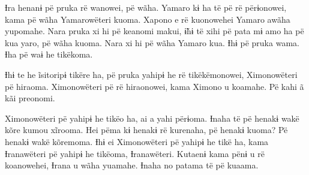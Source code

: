 Ɨra henanɨ pë pruka rë wanowei, pë wãha. Yamaro kɨ ha të pë rë
përɨonowei, kama pë wãha Yamarowëteri kuoma. Xapono e rë kuonowehei
Yamaro awãha yupomahe. Nara pruka xi hi pë keanomi makui, ɨ̃hɨ të xihi pë
pata mɨ amo ha pë kua yaro, pë wãha kuoma. Nara xi hi pë wãha Yamaro
kua. Ɨhɨ pë pruka wama. Ɨha pë waɨ he tikëkoma. 

Ɨhɨ te he ĩsitoripɨ tikëre ha, pë pruka yahipɨ he rë tikëkëmonowei,
Ximonowëteri pë hiraoma. Ximonowëteri pë rë hiraonowei, kama Ximono u
koamahe. Pë kahi ã kãi preonomi. 

Ximonowëteri pë yahipɨ he tikëo ha, ai a yahi përɨoma. Ɨnaha të pë
henakɨ wakë kõre kumou xĩrooma. Hei pëma kɨ henakɨ rë kurenaha, pë
henakɨ kuoma? Pë henakɨ wakë kõremoma. Ɨhɨ ei Ximonowëteri pë yahipɨ he
tikë ha, kama Ɨranawëteri pë yahipɨ he tikëoma, Ɨranawëteri. Kutaenɨ
kama pënɨ u rë koanowehei, Ɨrana u wãha yuamahe. Ɨnaha no patama të pë
kuaama. 

 
